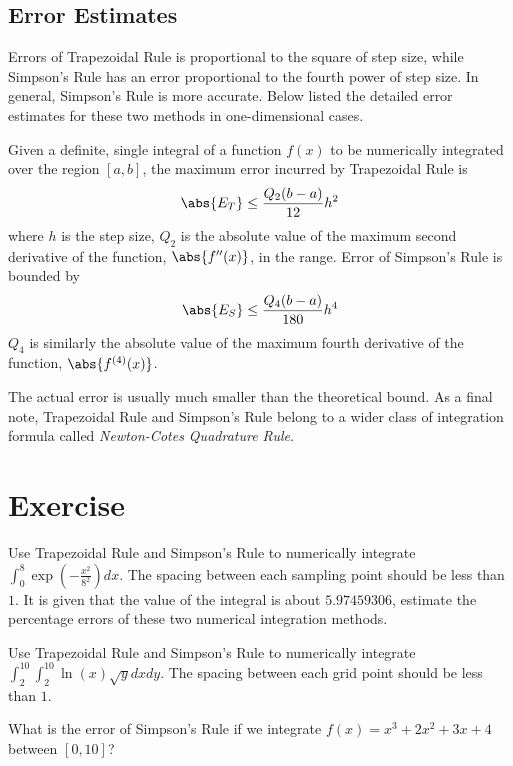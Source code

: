 \subsection{Error Estimates}
Errors of Trapezoidal Rule is proportional to the square of step size, while Simpson’s Rule has an error proportional to the fourth power of step size. In general, Simpson’s Rule is more accurate. Below listed the detailed error estimates for these two methods in one-dimensional cases.
\begin{proper}
Given a definite, single integral of a function $f(x)$ to be numerically integrated over the region $[a,b]$, the maximum error incurred by Trapezoidal Rule is
\begin{align*}
\abs{E_T} \leq \frac{Q_2(b-a)}{12}h^2
\end{align*}
where $h$ is the step size, $Q_2$ is the absolute value of the maximum second derivative of the function, $\abs{f''(x)}$, in the range. Error of Simpson's Rule is bounded by
\begin{align*}
\abs{E_S} \leq \frac{Q_4(b-a)}{180}h^4
\end{align*}
$Q_4$ is similarly the absolute value of the maximum fourth derivative of the function, $\abs{f^{(4)}(x)}$.
\end{proper}
The actual error is usually much smaller than the theoretical bound. As a final note, Trapezoidal Rule and Simpson’s Rule belong to a wider class of integration formula called \textit{Newton-Cotes Quadrature Rule}.

\section{Exercise}

\begin{Exercise}
Use Trapezoidal Rule and Simpson's Rule to numerically integrate $\int_0^{8} \exp(-\frac{x^2}{8^2}) dx$. The spacing between each sampling point should be less than $1$. It is given that the value of the integral is about $5.97459306$, estimate the percentage errors of these two numerical integration methods.
\end{Exercise}

\begin{Exercise}
Use Trapezoidal Rule and Simpson's Rule to numerically integrate $\int_2^{10}\int_2^{10} \ln(x)\sqrt{y} dxdy$. The spacing between each grid point should be less than $1$.
\end{Exercise}

\begin{Exercise}
What is the error of Simpson's Rule if we integrate $f(x) = x^3 + 2x^2 + 3x + 4$ between $[0, 10]$?
\end{Exercise}

